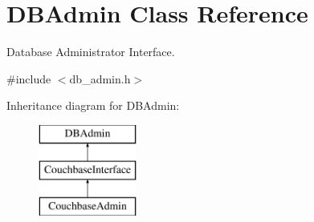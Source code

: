 \hypertarget{classDBAdmin}{\section{D\-B\-Admin Class Reference}
\label{classDBAdmin}
}


Database Administrator Interface.  




{\ttfamily \#include $<$db\-\_\-admin.\-h$>$}

Inheritance diagram for D\-B\-Admin\-:\begin{figure}[H]
\begin{center}
\leavevmode
\includegraphics[height=3.000000cm]{classDBAdmin}
\end{center}
\end{figure}
